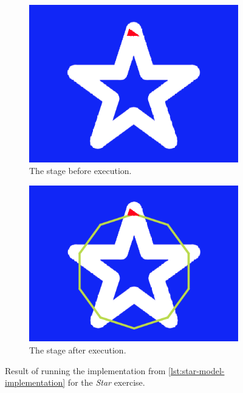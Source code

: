 \documentclass[../main]{subfiles}
\begin{document}
\begin{figure}
    \begin{subfigure}{0.45\textwidth}
        \includegraphics[width=\textwidth]{star-before}
        \caption{The stage before execution.}
        \label{fig:star-exercise-model-before}
    \end{subfigure}
    \hfill
    \begin{subfigure}{0.45\textwidth}
        \includegraphics[width=\textwidth]{star-after}
        \caption{The stage after execution.}
        \label{fig:star-exercise-model-after}
    \end{subfigure}
    \caption{Result of running the implementation from \cref{lst:star-model-implementation} for the \emph{Star} exercise.}
    \label{fig:star-exercise-model}
\end{figure}
\end{document}
